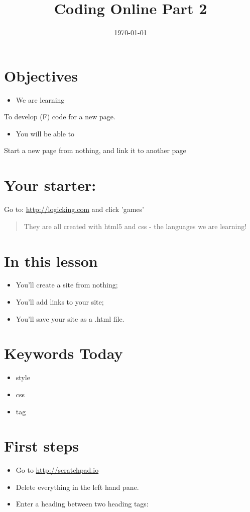 \documentclass[11pt]{article}
\date{\today}
\title{Coding Online Part 2}
\begin{document}
\maketitle
\section*{Objectives}
\label{sec:orgheadline1}
\begin{itemize}
\item We are learning
\end{itemize}
To develop (F) code for a new page.
\begin{itemize}
\item You will be able to
\end{itemize}
Start a new page from nothing, and link it to another page
\section*{Your starter:}
\label{sec:orgheadline2}
Go to:
\url{http://logicking.com}
and click 'games'

\begin{quote}
They are all created with html5 and css - the languages we are learning!
\end{quote}

\section*{In this lesson}
\label{sec:orgheadline3}
\begin{itemize}
\item You'll create a site from nothing;
\item You'll add links to your site;
\item You'll save your site as a .html file.
\end{itemize}
\section*{Keywords Today}
\label{sec:orgheadline4}
\begin{itemize}
\item style
\item css
\item tag
\end{itemize}
\section*{First steps}
\label{sec:orgheadline5}
\begin{itemize}
\item Go to \url{http://scratchpad.io}
\item Delete everything in the left hand pane.
\item Enter a heading between two heading tags:
\end{itemize}
\end{document}
